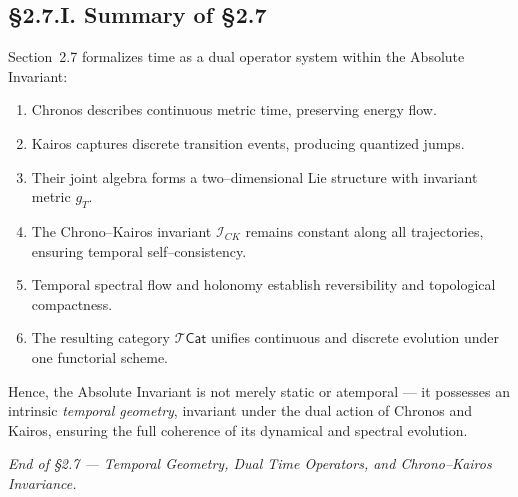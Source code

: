 \subsection*{§2.7.I. Summary of §2.7}

Section~2.7 formalizes time as a dual operator system within the Absolute Invariant:
\begin{enumerate}
  \item Chronos describes continuous metric time, preserving energy flow.
  \item Kairos captures discrete transition events, producing quantized jumps.
  \item Their joint algebra forms a two–dimensional Lie structure with invariant metric $g_T$.
  \item The Chrono–Kairos invariant $\mathcal{I}_{CK}$ remains constant along all trajectories, ensuring temporal self–consistency.
  \item Temporal spectral flow and holonomy establish reversibility and topological compactness.
  \item The resulting category $\mathcal{T}\!\mathsf{Cat}$ unifies continuous and discrete evolution under one functorial scheme.
\end{enumerate}

Hence, the Absolute Invariant is not merely static or atemporal — it possesses an intrinsic \emph{temporal geometry}, invariant under the dual action of Chronos and Kairos, ensuring the full coherence of its dynamical and spectral evolution.

\begin{center}
\textit{End of §2.7 — Temporal Geometry, Dual Time Operators, and Chrono–Kairos Invariance.}
\end{center}


